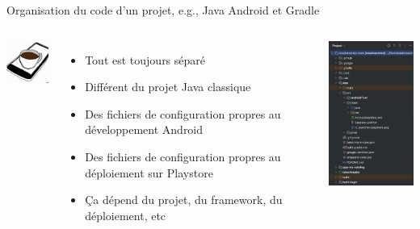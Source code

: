 \documentclass{beamer}
\begin{document}
    \begin{frame}{Organisation du code d'un projet, e.g., Java Android et Gradle}

        \begin{columns}


            \centering
            \includegraphics[width=2cm]{image/android-coffee}

            \begin{itemize}

                \item Tout est toujours séparé
                \item Différent du projet Java classique
                \item Des fichiers de configuration propres au développement Android
                \item Des fichiers de configuration propres au déploiement sur Playstore
                \item Ça dépend du projet, du framework, du déploiement, etc

            \end{itemize}


            \centering
            \includegraphics[width=4cm]{image/android-gradle-project-structure}

        \end{columns}

    \end{frame}
\end{document}
